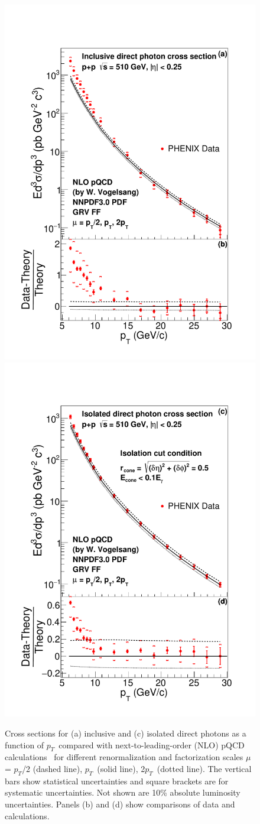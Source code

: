 \documentclass[twocolumn,letterpaper,aps,prl,longbibliography,superscriptaddress,floatfix]{revtex4-2}
\newcommand{\pT}{\ensuremath{p_T}}
\begin{document}
\begin{figure}[hbt!]
\includegraphics[width=0.48\linewidth]{CrossSection-photon-werner.pdf}
\includegraphics[width=0.48\linewidth]{CrossSection-isophoton-werner.pdf}
\caption{Cross sections for (a) inclusive and (c) isolated direct photons as a function of \pT\ compared with next-to-leading-order (NLO) pQCD calculations~\cite{PhysRevD.48.3136,PhysRevD.50.1901} for different renormalization and factorization scales $\mu$ = \pT/2 (dashed line), \pT\ (solid line), 2\pT\ (dotted line). The vertical bars show statistical uncertainties and square brackets are for systematic uncertainties. Not shown are 10\% absolute luminosity uncertainties. Panels (b) and (d) show comparisons of data and calculations.}
\label{fig:xsect}
\end{figure} 
\end{document}
